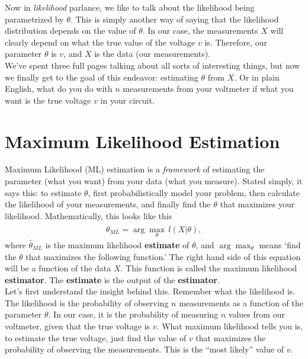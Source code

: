 \documentclass[10pt,letterpaper]{article}
\begin{document}
Now in \emph{likelihood} parlance, we like to talk about the likelihood being parametrized by $\theta$. This is simply another way of saying that the likelihood distribution depends on the value of $\theta$. In our case, the measurements $X$ will clearly depend on what the true value of the voltage $v$ is. Therefore, our parameter $\theta$ is $v$, and $X$ is the data (our measurements).\\

We've spent three full pages talking about all sorts of interesting things, but now we finally get to the goal of this endeavor: estimating $\theta$ from $X$. Or in plain English, what do you do with $n$ measurements from your voltmeter if what you want is the true voltage $v$ in your circuit.

\section{Maximum Likelihood Estimation}
Maximum Likelihood (ML) estimation is a \emph{framework} of estimating the parameter (what you want) from your data (what you measure). Stated simply, it says this: to estimate $\theta$, first probabilistically model your problem, then calculate the likelihood of your measurements, and finally find the $\theta$ that maximizes your likelihood. Mathematically, this looks like this
\begin{align}
 	\widehat{\theta}_{ML} = \arg \max_\theta\, l(X\vert\theta),
 \end{align} 
where $\widehat{\theta}_{ML}$ is the maximum likelihood \textbf{estimate} of $\theta$, and $ \arg \max_\theta$ means `find the $\theta$ that maximizes the following function.' The right hand side of this equation will be a function of the data $X$. This function is called the maximum likelihood \textbf{estimator}. The \textbf{estimate} is the output of the \textbf{estimator}.\\

Let's first understand the insight behind this. Remember what the likelihood is. The likelihood is the probability of observing $n$ measurements as a function of the parameter $\theta$. In our case, it is the probability of measuring $n$ values from our voltmeter, given that the true voltage is $v$. What maximum likelihood tells you is, to estimate the true voltage, just find the value of $v$ that maximizes the probability of observing the measurements. This is the ``most likely'' value of $v$.\\
\end{document}
